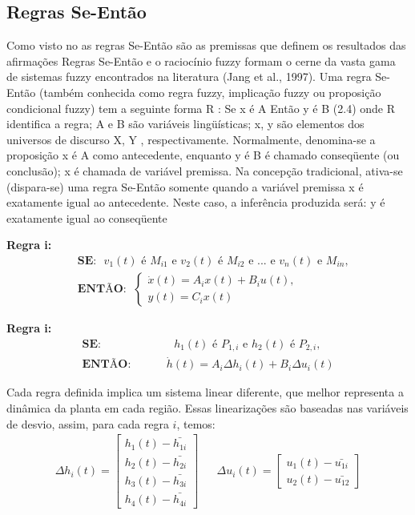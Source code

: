 \subsection{Regras Se-Então}
Como visto no  as regras Se-Então são as premissas que definem os resultados das afirmações 
Regras Se-Então e o raciocínio fuzzy formam o cerne da vasta gama de sistemas fuzzy encontrados
na literatura (Jang et al., 1997). Uma regra Se-Então (também conhecida como regra
fuzzy, implicação fuzzy ou proposição condicional fuzzy) tem a seguinte forma
R :
Se x é A
Então y é B
(2.4)
onde R identifica a regra; A e B são variáveis lingüísticas; x, y são elementos dos universos
de discurso X, Y , respectivamente. Normalmente, denomina-se a proposição x é A como
antecedente, enquanto y é B é chamado conseqüente (ou conclusão); x é chamada de variável
premissa.
Na concepção tradicional, ativa-se (dispara-se) uma regra Se-Então somente quando a
variável premissa x é exatamente igual ao antecedente. Neste caso, a inferência produzida
será: y é exatamente igual ao conseqüente

	\textbf{Regra i:}
	\begin{align}
		&\textbf{SE:} \text{ $v_1(t)$ é $M_{i1}$ e $v_2(t)$ é $M_{i2}$ e ... e $v_n(t)$ e $M_{in}$,} \\
		&\textbf{ENTÃO}: \ \ \begin{cases}
			\dot{x}(t) = A_ix(t) + B_iu(t),\\
			y(t) = C_ix(t)
		\end{cases}
	\label{eqRegraIGeral}
	\end{align}
	
	\textbf{Regra i:}
	\begin{align}
		\textbf{SE:}  \hspace{1cm} &\text{ $h_1(t)$ é $P_{1,i}$ e $h_2(t)$ é $P_{2,i}$,} \\
		\textbf{ENTÃO:} \hspace{1cm} & \dot{h}(t) =  A_i \Delta h_i(t) +  B_i \Delta u_i(t)
	\end{align}
	
	Cada regra definida implica um sistema linear diferente, que melhor representa a dinâmica da planta em cada região. Essas linearizações são baseadas nas variáveis de desvio, assim, para cada regra $i$, temos:
	\begin{align}
		\Delta h_i(t) =
		\begin{bmatrix}
			h_1(t) - \bar{h_{1i}} \\
			h_2(t) - \bar{h_{2i}} \\
			h_3(t) - \bar{h_{3i}} \\
			h_4(t) - \bar{h_{4i}}
		\end{bmatrix} 
		&&
		\Delta u_i(t) = 
		\begin{bmatrix}
			u_1(t) - \bar{u_{1i}} \\
			u_2(t) - \bar{u_{12}}
		\end{bmatrix}
	\end{align}	


